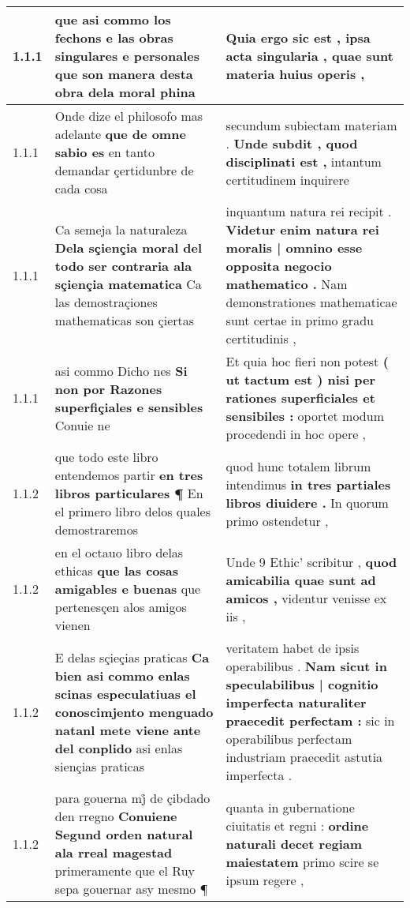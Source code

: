 \begin{tabular}{|p{1cm}|p{6.5cm}|p{6.5cm}|}

\hline
1.1.1 & que asi commo los fechons \textbf{ e las obras singulares e personales } que son manera desta obra dela moral phina & Quia ergo sic est , \textbf{ ipsa acta singularia , } quae sunt materia huius operis , \\\hline
1.1.1 & Onde dize el philosofo mas adelante \textbf{ que de omne sabio es } en tanto demandar çertidunbre de cada cosa & secundum subiectam materiam . \textbf{ Unde subdit , quod disciplinati est , } intantum certitudinem inquirere \\\hline
1.1.1 & Ca semeja la naturaleza \textbf{ Dela sçiençia moral del todo ser contraria ala sçiençia matematica } Ca las demostraçiones mathematicas son çiertas & inquantum natura rei recipit . \textbf{ Videtur enim natura rei moralis | omnino esse opposita negocio mathematico . } Nam demonstrationes mathematicae sunt certae in primo gradu certitudinis , \\\hline
1.1.1 & asi commo Dicho nes \textbf{ Si non por Razones superfiçiales e sensibles } Conuie ne & Et quia hoc fieri non potest \textbf{ ( ut tactum est ) nisi per rationes superficiales et sensibiles : } oportet modum procedendi in hoc opere , \\\hline
1.1.2 & que todo este libro entendemos partir \textbf{ en tres libros particulares ¶ } En el primero libro delos quales demostraremos & quod hunc totalem librum intendimus \textbf{ in tres partiales libros diuidere . } In quorum primo ostendetur , \\\hline
1.1.2 & en el octauo libro delas ethicas \textbf{ que las cosas amigables e buenas } que pertenesçen alos amigos vienen & Unde 9 Ethic’ scribitur , \textbf{ quod amicabilia quae sunt ad amicos , } videntur venisse ex iis , \\\hline
1.1.2 & E delas sçieçias praticas \textbf{ Ca bien asi commo enlas scinas especulatiuas el conoscimjento menguado natanl mete viene ante del conplido } asi enlas siençias praticas & veritatem habet de ipsis operabilibus . \textbf{ Nam sicut in speculabilibus | cognitio imperfecta naturaliter praecedit perfectam : } sic in operabilibus perfectam industriam praecedit astutia imperfecta . \\\hline
1.1.2 & para gouerna mj̊ de çibdado den rregno \textbf{ Conuiene Segund orden natural ala rreal magestad } primeramente que el Ruy sepa gouernar asy mesmo ¶ & quanta in gubernatione ciuitatis et regni : \textbf{ ordine naturali decet regiam maiestatem } primo scire se ipsum regere , \\\hline

\end{tabular}
